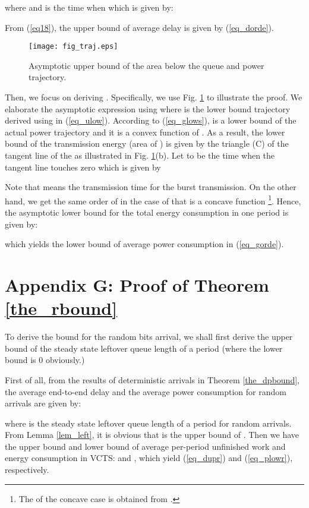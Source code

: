\documentclass[11pt,journal, onecolumn]{./IEEEtran}
\newcommand{\red}{\color{black}}
\begin{document}
where  and  is the time when  which is given by:

From (\ref{eq18}), the upper bound of average delay  is given by (\ref{eq_dorde}).

\begin{figure}[t!]
\centering
\texttt{[image: fig\_traj.eps]}
\caption{Asymptotic upper bound of the area below the queue and power trajectory.} \label{fig_traj}
\end{figure}


{\red Then, we focus on deriving . Specifically, we use Fig. \ref{fig_traj} to illustrate the proof. We elaborate the asymptotic expression using  where  is the lower bound trajectory derived using  in (\ref{eq_ulow}). According to (\ref{eq_glows}),  is a lower bound of the actual power trajectory and it is a convex function of . As a result, the lower bound of the transmission energy (area of ) is given by the triangle (C) of the tangent line of the  as illustrated in Fig. \ref{fig_traj}(b). Let  to be the time when the tangent line touches zero which is given by

Note that  means the transmission time for the burst transmission. On the other hand, we get the same order of  in the case of that  is a concave function \footnote{The  of the concave case is obtained from .}. Hence, the asymptotic lower bound for the total energy consumption in one period is given by:

which yields the lower bound of average power consumption in (\ref{eq_gorde}).}







\section*{Appendix G: Proof of Theorem \ref{the_rbound}}\label{app_rbound}
{\red To derive the bound for the random bits arrival, we shall first derive the upper bound of the steady state leftover queue length of a period (where the lower bound is 0 obviously.)}

{\red First of all, from the results of deterministic arrivals in Theorem \ref{the_dpbound},} the average end-to-end delay  and the average power consumption  for random arrivals are given by:


where  is the steady state leftover queue length of a period for random arrivals. {\red From Lemma \ref{lem_left}, it is obvious that  is the upper bound of .} Then we have the upper bound and lower bound of average per-period unfinished work and energy consumption in VCTS:
 and , 
which yield (\ref{eq_dupr}) and (\ref{eq_plowr}), respectively.
\end{document}
